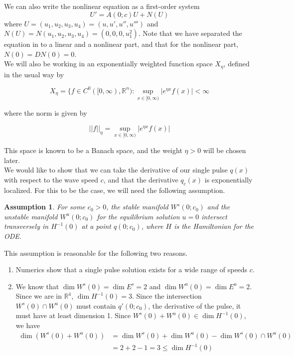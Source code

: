 \documentclass[12pt]{article}
\def\R{{\mathbb R}}
\newtheorem{assumption}{Assumption}
\begin{document}
We can also write the nonlinear equation as a first-order system
\begin{equation}\label{nonlinearsystem}
U' = A(0; c) U + N(U)
\end{equation}
where $U = (u_1, u_2, u_3, u_4) = (u, u', u'', u''')$ and $N(U) = N(u_1, u_2, u_3, u_4) = (0, 0, 0, u_1^2)$. Note that we have separated the equation in to a linear and a nonlinear part, and that for the nonlinear part, $N(0) = DN(0) = 0$.\\

We will also be working in an exponentially weighted function space $X_\eta$, defined in the usual way by 

\[
X_\eta = \{ f \in C^0([0, \infty), \R^n) : \sup_{x \in [0, \infty)} |e^{\eta x} f(x)| < \infty 
\]

where the norm is given by

\[
||f||_\eta = \sup_{x \in [0, \infty)} |e^{\eta x} f(x)|
\]

This space is known to be a Banach space, and the weight $\eta > 0$ will be chosen later.\\

We would like to show that we can take the derivative of our single pulse $q(x)$ with respect to the wave speed $c$, and that the derivative $q_c(x)$ is exponentially localized. For this to be the case, we will need the following assumption.

\begin{assumption}\label{transverseint}
For some $c_0 > 0$, the stable manifold $W^s(0; c_0)$ and the unstable manifold $W^u(0; c_0)$ for the equilibrium solution $u = 0$ intersect transversely in $H^{-1}(0)$ at a point $q(0; c_0)$, where $H$ is the Hamiltonian for the ODE.
\end{assumption}

This assumption is reasonable for the following two reasons.
\begin{enumerate}
	\item Numerics show that a single pulse solution exists for a wide range of speeds $c$.
	\item We know that $\dim W^s(0) = \dim E^s = 2$ and $\dim W^u(0) = \dim E^u = 2$. Since we are in $\R^4$, $\dim H^{-1}(0) = 3$. Since the intersection $W^s(0) \cap W^u(0)$ must contain $q'(0; c_0)$, the derivative of the pulse, it must have at least dimension 1. Since $W^s(0) + W^u(0) \in \dim H^{-1}(0)$, we have
	\begin{align*}
	\dim( W^s(0) + W^u(0) ) &= \dim W^s(0) + \dim W^u(0) - \dim W^s(0) \cap W^u(0) \\
	&= 2 + 2 - 1 = 3 \leq \dim H^{-1}(0)
	\end{align*}
\end{enumerate}
\end{document}
